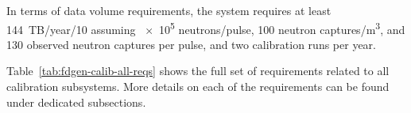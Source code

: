 

In terms of data volume requirements, the  system requires at least \num{144}~TB/year/\SI{10}{\kt} assuming \num{e5} neutrons/pulse, \num{100} neutron captures/\si{\cubic\m},
and \num{130} observed neutron captures per pulse, and two calibration runs per year. 

Table~\ref{tab:fdgen-calib-all-reqs} shows the full set of requirements related to all calibration subsystems. More details on each of the requirements can be found under dedicated subsections.   

%



\begin{comment}

\begin{dunetable}
[Top-level specifications for calibration subsystems]
{p{0.45\linewidth}p{0.25\linewidth}p{0.25\linewidth}}
{tab:fdgen-calib-toplevel-reqs} 
{List of Top-Level Specifications for the Calibration Subsystems. Global DUNE requirements are listed in bold.}   Quantity/Parameter	& Specification	& Goal		 \\ \toprowrule      
{\bf Noise from calibration devices}	 & $\ll$ 1000 enc   & \\ \colhline    
{\bf Max. \efield near calibration devices} & < 30 kV/cm & <15 kV/cm \\ \colhline     
Ionization Laser \efield measurement precision & 1\% & <1\% \\ \colhline
Ionization Laser \efield measurement coverage & > 75\% & 100\% \\ \colhline
Ionization Laser \efield measurement granularity & < \num{30}x\num{30}x\num{30}~cm & \num{10}x\num{10}x\num{10}~cm \\ \colhline
Laser beam location precision & 0.5 mrad & 0.5 mrad \\ \colhline
Neutron source coverage & > 75\% & 100\% \\ \colhline %
Ionization laser data volume (per 10 kton) & 90~TB/year & 185~TB/year\\ \colhline
Neutron source data volume (per 10~kton) & 84~TB/year & 168~TB/year\\ \colhline
Rate of 9~MeV capture $\gamma$-events inside the proposed radioactive source & < 1~kHz & \\ 
\end{dunetable}
\end{comment}

